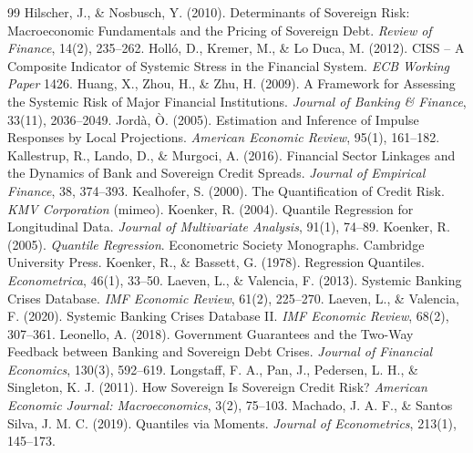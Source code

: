 \begin{thebibliography}{99}
 Hilscher, J., \& Nosbusch, Y. (2010). Determinants of Sovereign Risk: Macroeconomic Fundamentals and the Pricing of Sovereign Debt. \textit{Review of Finance}, 14(2), 235--262.
 Holló, D., Kremer, M., \& Lo Duca, M. (2012). CISS -- A Composite Indicator of Systemic Stress in the Financial System. \textit{ECB Working Paper} 1426.
 Huang, X., Zhou, H., \& Zhu, H. (2009). A Framework for Assessing the Systemic Risk of Major Financial Institutions. \textit{Journal of Banking \& Finance}, 33(11), 2036--2049.
 Jordà, Ò. (2005). Estimation and Inference of Impulse Responses by Local Projections. \textit{American Economic Review}, 95(1), 161--182.
 Kallestrup, R., Lando, D., \& Murgoci, A. (2016). Financial Sector Linkages and the Dynamics of Bank and Sovereign Credit Spreads. \textit{Journal of Empirical Finance}, 38, 374--393.
 Kealhofer, S. (2000). The Quantification of Credit Risk. \textit{KMV Corporation} (mimeo).
 Koenker, R. (2004). Quantile Regression for Longitudinal Data. \textit{Journal of Multivariate Analysis}, 91(1), 74--89.
 Koenker, R. (2005). \textit{Quantile Regression}. Econometric Society Monographs. Cambridge University Press.
 Koenker, R., \& Bassett, G. (1978). Regression Quantiles. \textit{Econometrica}, 46(1), 33--50.
 Laeven, L., \& Valencia, F. (2013). Systemic Banking Crises Database. \textit{IMF Economic Review}, 61(2), 225--270.
 Laeven, L., \& Valencia, F. (2020). Systemic Banking Crises Database II. \textit{IMF Economic Review}, 68(2), 307--361.
 Leonello, A. (2018). Government Guarantees and the Two-Way Feedback between Banking and Sovereign Debt Crises. \textit{Journal of Financial Economics}, 130(3), 592--619.
 Longstaff, F. A., Pan, J., Pedersen, L. H., \& Singleton, K. J. (2011). How Sovereign Is Sovereign Credit Risk? \textit{American Economic Journal: Macroeconomics}, 3(2), 75--103.
 Machado, J. A. F., \& Santos Silva, J. M. C. (2019). Quantiles via Moments. \textit{Journal of Econometrics}, 213(1), 145--173.

\end{thebibliography}
